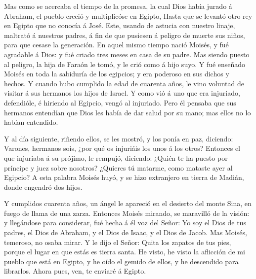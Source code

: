  Mas como se acercaba el tiempo de la promesa, la cual
Dios había jurado á Abraham, el pueblo creció y multiplicóse en Egipto,
 Hasta que se levantó otro rey en Egipto que no conocía á
José.  Este, usando de astucia con nuestro linaje,
maltrató á nuestros padres, á fin de que pusiesen á peligro de muerte
sus niños, para que cesase la generación.  En aquel mismo
tiempo nació Moisés, y fué agradable á Dios: y fué criado tres meses en
casa de su padre.  Mas siendo puesto al peligro, la hija
de Faraón le tomó, y le crió como á hijo suyo.  Y fué
enseñado Moisés en toda la sabiduría de los egipcios; y era poderoso en
sus dichos y hechos.  Y cuando hubo cumplido la edad de
cuarenta años, le vino voluntad de visitar á sus hermanos los hijos de
Israel.  Y como vió á uno que era injuriado, defendióle,
é hiriendo al Egipcio, vengó al injuriado.  Pero él
pensaba que sus hermanos entendían que Dios les había de dar salud por
su mano; mas ellos no lo habían entendido.

 Y al día siguiente, riñendo ellos, se les mostró, y los
ponía en paz, diciendo: Varones, hermanos sois, ¿por qué os injuriáis
los unos á los otros?  Entonces el que injuriaba á su
prójimo, le rempujó, diciendo: ¿Quién te ha puesto por príncipe y juez
sobre nosotros?  ¿Quieres tú matarme, como mataste ayer
al Egipcio?  A esta palabra Moisés huyó, y se hizo
extranjero en tierra de Madián, donde engendró dos hijos.

 Y cumplidos cuarenta años, un ángel le apareció en el
desierto del monte Sina, en fuego de llama de una zarza. 
Entonces Moisés mirando, se maravilló de la visión: y llegándose para
considerar, fué hecha á él voz del Señor:  Yo soy el Dios
de tus padres, el Dios de Abraham, y el Dios de Isaac, y el Dios de
Jacob. Mas Moisés, temeroso, no osaba mirar.  Y le dijo
el Señor: Quita los zapatos de tus pies, porque el lugar en que estás es
tierra santa.  He visto, he visto la aflicción de mi
pueblo que está en Egipto, y he oído el gemido de ellos, y he descendido
para librarlos. Ahora pues, ven, te enviaré á Egipto.

